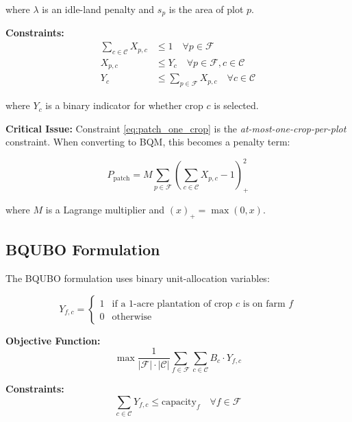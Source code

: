 \documentclass[11pt,a4paper]{article}
\begin{document}
where $\lambda$ is an idle-land penalty and $s_p$ is the area of plot $p$.

\textbf{Constraints:}
\begin{align}
\sum_{c \in \mathcal{C}} X_{p,c} &\leq 1 \quad \forall p \in \mathcal{F} \label{eq:patch_one_crop} \\
X_{p,c} &\leq Y_c \quad \forall p \in \mathcal{F}, c \in \mathcal{C} \label{eq:patch_linking} \\
Y_c &\leq \sum_{p \in \mathcal{F}} X_{p,c} \quad \forall c \in \mathcal{C} \label{eq:patch_activation}
\end{align}

where $Y_c$ is a binary indicator for whether crop $c$ is selected.

\textbf{Critical Issue:} Constraint \eqref{eq:patch_one_crop} is the \emph{at-most-one-crop-per-plot} constraint. When converting to BQM, this becomes a penalty term:

\begin{equation}
P_{\text{patch}} = M \sum_{p \in \mathcal{F}} \left(\sum_{c \in \mathcal{C}} X_{p,c} - 1\right)^2_+
\label{eq:patch_penalty}
\end{equation}

where $M$ is a Lagrange multiplier and $(x)_+ = \max(0, x)$.

\subsection{BQUBO Formulation}

The BQUBO formulation uses binary unit-allocation variables:

\begin{equation}
Y_{f,c} = \begin{cases}
1 & \text{if a 1-acre plantation of crop } c \text{ is on farm } f \\
0 & \text{otherwise}
\end{cases}
\end{equation}

\textbf{Objective Function:}
\begin{equation}
\max \frac{1}{|\mathcal{F}| \cdot |\mathcal{C}|} \sum_{f \in \mathcal{F}} \sum_{c \in \mathcal{C}} B_c \cdot Y_{f,c}
\end{equation}

\textbf{Constraints:}
\begin{equation}
\sum_{c \in \mathcal{C}} Y_{f,c} \leq \text{capacity}_f \quad \forall f \in \mathcal{F}
\label{eq:bqubo_capacity}
\end{equation}
\end{document}
